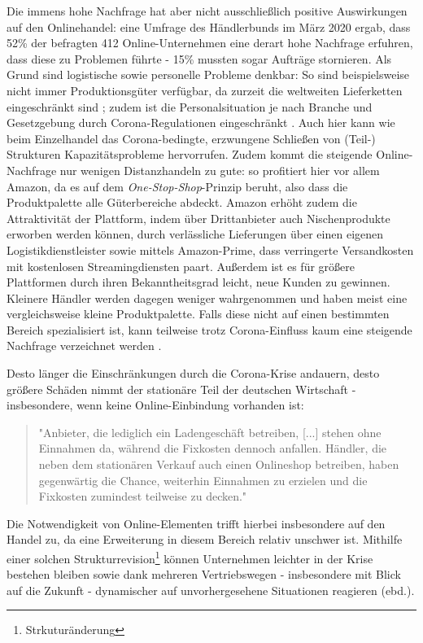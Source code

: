 \begin{folding}

Die immens hohe Nachfrage hat aber nicht ausschließlich positive Auswirkungen auf den Onlinehandel: eine Umfrage des Händlerbunds im März 2020 ergab, dass 52\% der befragten 412 Online-Unternehmen eine derart hohe Nachfrage erfuhren, dass diese zu Problemen führte - 15\% mussten sogar Aufträge stornieren. Als Grund sind logistische sowie personelle Probleme denkbar: So sind beispielsweise nicht immer Produktionsgüter verfügbar, da zurzeit die weltweiten Lieferketten eingeschränkt sind \cite{corona-wettbewerb}; zudem ist die Personalsituation je nach Branche und Gesetzgebung durch Corona-Regulationen eingeschränkt \cite{haendlerbund-studie}. Auch hier kann wie beim Einzelhandel das Corona-bedingte, erzwungene Schließen von (Teil-) Strukturen Kapazitätsprobleme hervorrufen. Zudem kommt die steigende Online-Nachfrage nur wenigen Distanzhandeln zu gute: so profitiert hier vor allem Amazon, da es auf dem \emph{One-Stop-Shop}-Prinzip beruht, also dass die Produktpalette alle Güterbereiche abdeckt. Amazon erhöht zudem die Attraktivität der Plattform, indem über Drittanbieter auch Nischenprodukte erworben werden können, durch verlässliche Lieferungen über einen eigenen Logistikdienstleister sowie mittels Amazon-Prime, dass verringerte Versandkosten mit kostenlosen Streamingdiensten paart. Außerdem ist es für größere Plattformen durch ihren Bekanntheitsgrad leicht, neue Kunden zu gewinnen. Kleinere Händler werden dagegen weniger wahrgenommen und haben meist eine vergleichsweise kleine Produktpalette. Falls diese nicht auf einen bestimmten Bereich spezialisiert ist, kann teilweise trotz Corona-Einfluss kaum eine steigende Nachfrage verzeichnet werden \cite{corona-amazon}.

Desto länger die Einschränkungen durch die Corona-Krise andauern, desto größere Schäden nimmt der stationäre Teil der deutschen Wirtschaft - insbesondere, wenn keine Online-Einbindung vorhanden ist: 
 
\begin{quote}
    "Anbieter, die lediglich ein Ladengeschäft betreiben, [...] stehen  ohne  Einnahmen  da,  während  die  Fixkosten  dennoch  anfallen.  Händler,  die  neben  dem  stationären  Verkauf  auch  einen  Onlineshop  betreiben,  haben  gegenwärtig  die  Chance,  weiterhin  Einnahmen  zu erzielen und die Fixkosten zumindest teilweise zu decken." \cite{corona-wettbewerb}
\end{quote}
Die Notwendigkeit von Online-Elementen trifft hierbei insbesondere auf den Handel zu, da eine Erweiterung in diesem Bereich relativ unschwer ist. Mithilfe einer solchen Strukturrevision\footnote{Strkuturänderung} können Unternehmen leichter in der Krise bestehen bleiben sowie dank mehreren Vertriebswegen - insbesondere mit Blick auf die Zukunft - dynamischer auf unvorhergesehene Situationen reagieren (ebd.).
 
\end{folding}




